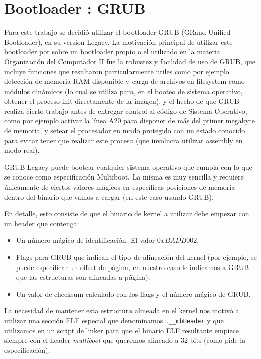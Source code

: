 \section{Bootloader : GRUB}
\label{sec::grub}

Para este trabajo se decidi\'o utilizar el bootloader GRUB (GRand Unified Bootloader),
en su version Legacy. La motivaci\'on principal de utilizar este bootloader por sobre
un bootloader propio o el utilizado en la materia Organizaci\'on del Computador II fue
la robustez y facilidad de uso de GRUB, que incluye funciones que resultaron particularmente
utiles como por ejemplo detecci\'on de memoria RAM disponible y carga de archivos en filesystem
como m\'odulos din\'amicos (lo cual se utiliza para, en el booteo de sistema operativo, obtener 
el proceso init directamente de la im\'agen), y el hecho de que GRUB realiza cierto trabajo antes
de entregar control al c\'odigo de Sistema Operativo, como por ejemplo activar la l\'inea A20 para
disponer de m\'as del primer megabyte de memoria, y setear el procesador en modo protegido con un
estado conocido para evitar tener que realizar este proceso (que involucra utilizar assembly en modo real). 

GRUB Legacy puede bootear cualquier sistema operativo que cumpla con lo que se conoce como especificaci\'on
Multiboot. La misma es muy sencilla y requiere \'unicamente de ciertos valores m\'agicos en espec\'ificas posiciones
de memoria dentro del binario que vamos a cargar (en este caso usando GRUB). 

En detalle, esto consiste de que el binario de kernel a utilizar debe empezar con un header que contenga:

\begin{itemize}
	\item Un n\'umero m\'agico de identificaci\'on: El valor $0xBADB002$.
	\item Flags para GRUB que indican el tipo de alineaci\'on del kernel (por ejemplo, se puede especificar un offset
	de p\'agina, en nuestro caso le indicamos a GRUB que las estructuras son alineadas a p\'agina).
	\item Un valor de checksum calculado con los flags y el n\'umero m\'agico de GRUB.  
\end{itemize}

La necesidad de mantener esta estructura alineada en el kernel nos motiv\'o a utilizar una secci\'on ELF especial
que denominamos \texttt{.\_\_mbHeader} y que utilizamos en un script de linker para que el binario ELF resultante empiece siempre
con el header \textit{multiboot} que queremos alineado a 32 bits (como pide la especificaci\'on).

